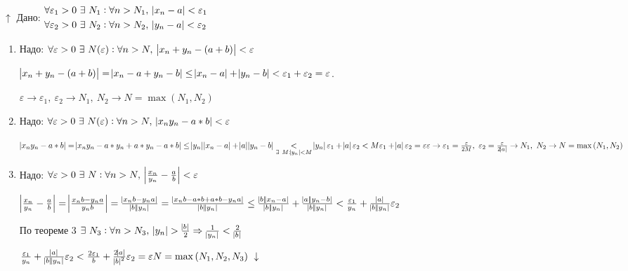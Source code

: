 \documentclass{article}
\begin{document}
    \(\uparrow\) Дано: \(\begin{aligned}
      	&\forall \varepsilon_1 > 0\ \exists\ N_1 : \forall n > N_1,\ \abs{x_n - a} < \varepsilon_1\\
        &\forall \varepsilon_2 > 0\ \exists\ N_2 : \forall n > N_2,\ \abs{y_n - a} < \varepsilon_2
        \end{aligned}\)
    
    \begin{enumerate}
    	\item Надо: \(\forall \varepsilon > 0\ \exists\ N(\varepsilon) : \forall n > N,\ \abs{x_n + y_n - (a+b)} < \varepsilon\)
        
        \(\abs{x_n + y_n - (a+b)} = \abs{x_n - a + y_n - b} \leq \abs{x_n - a} + \abs{y_n - b} < \varepsilon_1 + \varepsilon_2 = \varepsilon\).
        
        \(\varepsilon \rightarrow \varepsilon_1,\ \varepsilon_2 \rightarrow N_1,\ N_2 \rightarrow N = \max{(N_1, N_2)}\)
        
        \item Надо: \(\forall \varepsilon > 0\ \exists\ N(\varepsilon) : \forall n > N,\ \abs{x_n y_n - a*b} < \varepsilon\)
        
        \(\abs{x_n y_n - a*b} = \abs{x_n y_n - a*y_n + a*y_n - a*b} \leq \abs{y_n} \abs{x_n - a} + \abs{a} \abs{y_n - b} \underset{\exists\ M : \abs{y_n} < M} < \abs{y_n} \varepsilon_1 + \abs{a} \varepsilon_2 < M \varepsilon_1 + \abs{a} \varepsilon_2 = \varepsilon\\
        \varepsilon \rightarrow \varepsilon_1 = \frac{\varepsilon}{2M},\ \varepsilon_2 = \frac{\varepsilon}{2 \abs{a}} \rightarrow N_1,\ N_2 \rightarrow N = \max{(N_1, N_2)}\)
        
        \item Надо: \(\forall \varepsilon > 0\ \exists\ N : \forall n > N,\ \abs{\frac{x_n}{y_n} - \frac{a}{b}} < \varepsilon\)
        
        \(\abs{\frac{x_n}{y_n} - \frac{a}{b}} = \abs{\frac{x_n b - y_n a}{y_n b}} = \frac{\abs{x_n b - y_n a}}{\abs{b} \abs{y_n}} = \frac{\abs{x_n b - a*b + a*b - y_n a}}{\abs{b} \abs{y_n}} \leq \frac{\abs{b} \abs{x_n - a}}{\abs{b} \abs{y_n}} +
        \frac{\abs{a} \abs{y_n - b}}{\abs{b} \abs{y_n}} < \frac{\varepsilon_1}{y_n} + \frac{\abs{a}}{\abs{b} \abs{y_n}} \varepsilon_2\)
        
        По теореме 3 \(\exists\ N_3 : \forall n > N_3,\ \abs{y_n} > \frac{\abs{b}}{2} \Rightarrow \frac{1}{\abs{y_n}} < \frac{2}{\abs{b}}\)
        
        \(\frac{\varepsilon_1}{y_n} + \frac{\abs{a}}{\abs{b} \abs{y_n}} \varepsilon_2 < \frac{2 \varepsilon_1}{b} + \frac{2 \abs{a}}{\abs{b}^2} \varepsilon_2 = \varepsilon\\ N = \max{(N_1, N_2, N_3)}\ \downarrow\)
    \end{enumerate}
    
\end{document}
